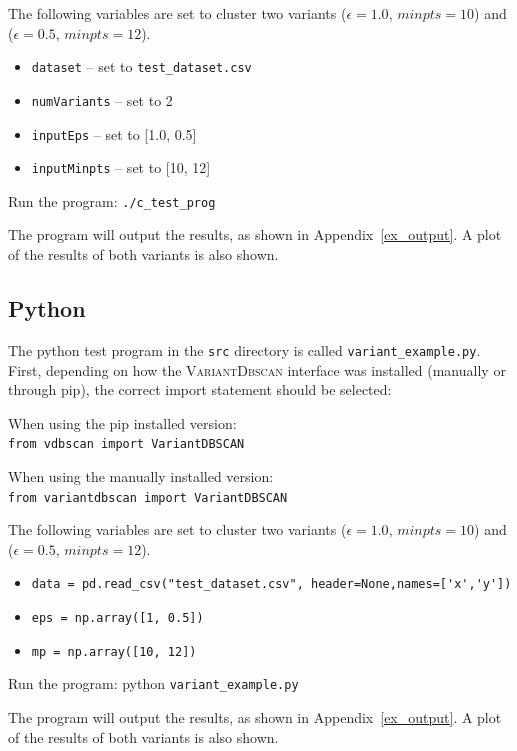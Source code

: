 \documentclass[12pt]{article}
\def\vdbscan{\textsc{VariantDbscan}\xspace}
\begin{document}
The following variables are set to cluster two variants ($\epsilon=1.0$, $minpts=10$) and ($\epsilon=0.5$, $minpts=12$).

\begin{itemize}
\item \verb|dataset| -- set to \verb|test_dataset.csv|
\item \verb|numVariants| -- set to 2
\item \verb|inputEps| -- set to [1.0, 0.5]
\item \verb|inputMinpts| -- set to [10, 12]
\end{itemize}


Run the program: \verb|./c_test_prog| 


The program will output the results, as shown in Appendix~\ref{ex_output}. A plot of the results of both variants is also shown.



\subsection{Python}
The python test program in the \texttt{src} directory is called \verb|variant_example.py|. First, depending on how the \vdbscan interface was installed (manually or through pip), the correct import statement should be selected:

\noindent When using the pip installed version:\\
\texttt{from vdbscan import VariantDBSCAN\\}

\noindent When using the manually installed version:\\
\texttt{from variantdbscan import VariantDBSCAN\\}


The following variables are set to cluster two variants ($\epsilon=1.0$, $minpts=10$) and ($\epsilon=0.5$, $minpts=12$).

\begin{itemize}
\item \verb|data = pd.read_csv("test_dataset.csv", header=None,names=['x','y'])|
\item \verb|eps = np.array([1, 0.5])|
\item \verb|mp = np.array([10, 12])|
\end{itemize}


Run the program: python \verb|variant_example.py|

The program will output the results, as shown in Appendix~\ref{ex_output}. A plot of the results of both variants is also shown.
\end{document}
